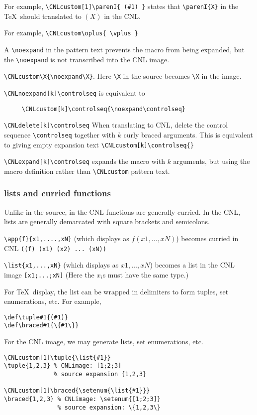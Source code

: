\documentclass[12pt]{amsart}
\begin{document}
For example, 
\verb!\CNLcustom[1]\parenI{ (#1) }! states that \verb!\parenI{X}! in the \TeX\ should translated to $(X)$ in the CNL.

For example,
\verb!\CNLcustom\oplus{ \vplus }!

A \verb!\noexpand! in the pattern text prevents the macro from being expanded, but the \verb!\noexpand! is not transcribed into the CNL image.

\verb!\CNLcustom\X{\noexpand\X}!.  Here \verb!\X! in the source becomes \verb!\X! in the image.

\verb!\CNLnoexpand[k]\controlseq! is equivalent to 
\begin{Verbatim}
     \CNLcustom[k]\controlseq{\noexpand\controlseq}
\end{Verbatim}

\verb!\CNLdelete[k]\controlseq!  When translating to CNL, delete the control sequence \verb!\controlseq! together with $k$ curly braced arguments.
This is equivalent to giving empty expansion text \verb!\CNLcustom[k]\controlseq{}! 

\verb!\CNLexpand[k]\controlseq! expands the macro with $k$ arguments, but using the macro definition rather than \verb!\CNLcustom! pattern text.


\subsubsection{lists and curried functions}

Unlike in the source, in the CNL functions are generally curried.
In the CNL, lists are generally demarcated with square brackets and semicolons.


\verb!\app{f}{x1,....,xN}! (which displays as $f(x1,...,xN)$) becomes curried in CNL \verb!((f) (x1) (x2) ... (xN))!

\verb!\list{x1,...,xN}! (which displays as $x1,\ldots,xN$)
becomes a list in the CNL image \verb![x1;...;xN]!  (Here the $x_i$s must have the same type.)

For \TeX\ display, the list can be wrapped in delimiters to form tuples, set enumerations, etc.
For example, 
\begin{Verbatim}
\def\tuple#1{(#1)}
\def\braced#1{\{#1\}}
\end{Verbatim}

For the CNL image, we may generate lists, set enumerations, etc. 
\begin{Verbatim}[fontfamily=tt,showspaces=false]
\CNLcustom[1]\tuple{\list{#1}}
\tuple{1,2,3} % CNLimage: [1;2;3]
              % source expansion {1,2,3}

\CNLcustom[1]\braced{\setenum{\list{#1}}} 
\braced{1,2,3} % CNLimage: \setenum{[1;2;3]}
               % source expansion: \{1,2,3\}
\end{Verbatim}
\end{document}
